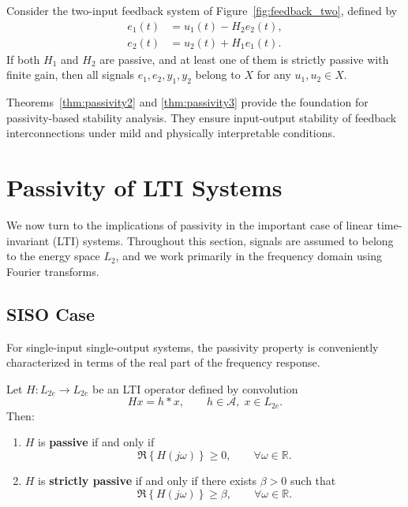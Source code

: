 \begin{theorem}\label{thm:passivity3}
Consider the two-input feedback system of Figure~\ref{fig:feedback_two}, defined by
\begin{align}
    e_1(t) &= u_1(t) - H_2 e_2(t), \label{eq:twoinput1}\\
    e_2(t) &= u_2(t) + H_1 e_1(t). \label{eq:twoinput2}
\end{align}
If both $H_1$ and $H_2$ are passive, and at least one of them is strictly passive 
with finite gain, then all signals $e_1, e_2, y_1, y_2$ belong to $X$ 
for any $u_1, u_2 \in X$.
\end{theorem}

\begin{remark}
Theorems~\ref{thm:passivity2} and \ref{thm:passivity3} provide the foundation for 
passivity-based stability analysis.  
They ensure input-output stability of feedback interconnections under mild and 
physically interpretable conditions.
\end{remark}

\section{Passivity of LTI Systems}

We now turn to the implications of passivity in the important case of 
linear time-invariant (LTI) systems. Throughout this section, signals are assumed 
to belong to the energy space $L_2$, and we work primarily in the frequency domain 
using Fourier transforms.  

\subsection{SISO Case}

For single-input single-output systems, the passivity property is conveniently 
characterized in terms of the real part of the frequency response.  

\begin{theorem}\label{thm:siso_passivity}
Let $H : L_{2e} \to L_{2e}$ be an LTI operator defined by convolution
\begin{equation}
Hx = h * x, 
\qquad h \in \mathcal{A},\; x \in L_{2e}.
\end{equation}
Then:
\begin{enumerate}
    \item $H$ is \textbf{passive} if and only if
    \begin{equation}
    \Re\!\left\{H(j\omega)\right\} \ge 0,
    \qquad \forall \omega \in \mathbb{R}.
    \end{equation}
    \item $H$ is \textbf{strictly passive} if and only if there exists $\beta>0$ such that
    \begin{equation}
    \Re\!\left\{H(j\omega)\right\} \ge \beta,
    \qquad \forall \omega \in \mathbb{R}.
    \end{equation}
\end{enumerate}
\end{theorem}

